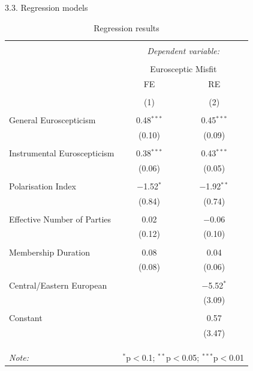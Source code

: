 \begin{frame}{3.3. Regression models}

\begin{table}[!htbp] \centering 
  \caption{Regression results} 
  \label{} 
\tiny 
\begin{tabular}{@{\extracolsep{5pt}}lcc} 
\\[-1.8ex]\hline 
\hline \\[-1.8ex] 
 & \multicolumn{2}{c}{\textit{Dependent variable:}} \\ 
\cline{2-3} 
\\[-1.8ex] & \multicolumn{2}{c}{Eurosceptic Misfit} \\ 
 & FE & RE \\ 
\\[-1.8ex] & (1) & (2)\\ 
\hline \\[-1.8ex] 
 General Euroscepticism & 0.48$^{***}$ & 0.45$^{***}$ \\ 
  & (0.10) & (0.09) \\ 
  & & \\ 
 Instrumental Euroscepticism & 0.38$^{***}$ & 0.43$^{***}$ \\ 
  & (0.06) & (0.05) \\ 
  & & \\ 
 Polarisation Index & $-$1.52$^{*}$ & $-$1.92$^{**}$ \\ 
  & (0.84) & (0.74) \\ 
  & & \\ 
 Effective Number of Parties & 0.02 & $-$0.06 \\ 
  & (0.12) & (0.10) \\ 
  & & \\ 
 Membership Duration & 0.08 & 0.04 \\ 
  & (0.08) & (0.06) \\ 
  & & \\ 
 Central/Eastern European &  & $-$5.52$^{*}$ \\ 
  &  & (3.09) \\ 
  & & \\ 
 Constant &  & 0.57 \\ 
  &  & (3.47) \\ 
  & & \\ 
\hline \\[-1.8ex] 
\hline 
\hline \\[-1.8ex] 
\textit{Note:}  & \multicolumn{2}{r}{$^{*}$p$<$0.1; $^{**}$p$<$0.05; $^{***}$p$<$0.01} \\ 
\end{tabular} 
\end{table}

\end{frame}

